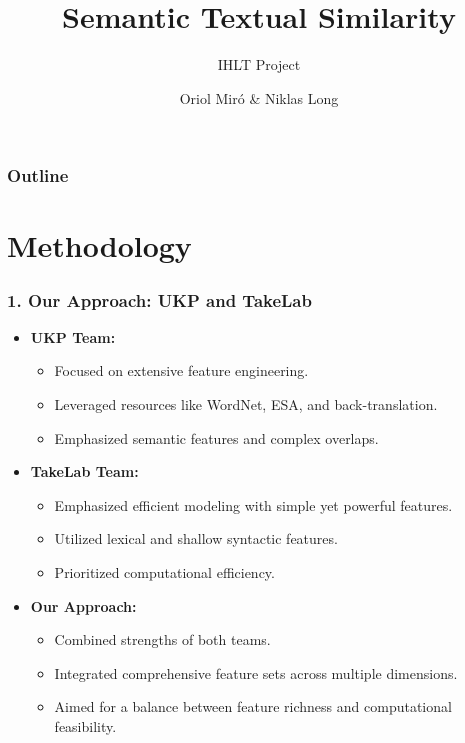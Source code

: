 \documentclass{beamer}
\title{Semantic Textual Similarity}
\subtitle{IHLT Project}
\author{Oriol Miró \& Niklas Long}
\institute{MAI | UPC}
\begin{document}
\begin{frame}
  \titlepage
\end{frame}

\begin{frame}
  \frametitle{Outline}
  \tableofcontents
\end{frame}

\section{Methodology}

\begin{frame}
  \frametitle{1. Our Approach: UKP\cite{bar-etal-2012-ukp} and TakeLab\cite{saric-etal-2012-takelab}}
  \begin{itemize}
    \item \textbf{UKP Team:}
    \begin{itemize}
      \item Focused on extensive feature engineering.
      \item Leveraged resources like WordNet, ESA, and back-translation.
      \item Emphasized semantic features and complex overlaps.
    \end{itemize}
    \vspace{0.5cm}
    \item \textbf{TakeLab Team:}
    \begin{itemize}
      \item Emphasized efficient modeling with simple yet powerful features.
      \item Utilized lexical and shallow syntactic features.
      \item Prioritized computational efficiency.
    \end{itemize}
    \vspace{0.5cm}
    \item \textbf{Our Approach:}
    \begin{itemize}
      \item Combined strengths of both teams.
      \item Integrated comprehensive feature sets across multiple dimensions.
      \item Aimed for a balance between feature richness and computational feasibility.
    \end{itemize}
  \end{itemize}
\end{frame}
\end{document}
